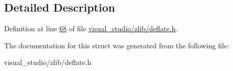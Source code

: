 \subsection{Detailed Description}


Definition at line \hyperlink{visual__studio_2zlib_2deflate_8h_source_l00068}{68} of file \hyperlink{visual__studio_2zlib_2deflate_8h_source}{visual\+\_\+studio/zlib/deflate.\+h}.



The documentation for this struct was generated from the following file\+:\begin{DoxyCompactItemize}
\item 
visual\+\_\+studio/zlib/deflate.\+h\end{DoxyCompactItemize}
